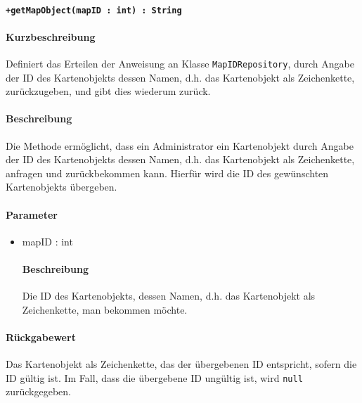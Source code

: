 \paragraph*{\texttt{+getMapObject(mapID : int) : String}}%
\paragraph*{Kurzbeschreibung}
Definiert das Erteilen der Anweisung an Klasse \texttt{MapIDRepository}, durch Angabe der ID des Kartenobjekts dessen Namen, d.h. das Kartenobjekt als Zeichenkette, zurückzugeben, und gibt dies wiederum zurück.
\paragraph*{Beschreibung}
Die Methode ermöglicht, dass ein Administrator ein Kartenobjekt durch Angabe der ID des Kartenobjekts dessen Namen, d.h. das Kartenobjekt als Zeichenkette, anfragen und zurückbekommen kann.
Hierfür wird die ID des gewünschten Kartenobjekts übergeben.
\paragraph*{Parameter}
\begin{itemize}
    \item mapID : int
    		\paragraph*{Beschreibung}
    		Die ID des Kartenobjekts, dessen Namen, d.h. das Kartenobjekt als Zeichenkette, man bekommen möchte.
\end{itemize}
\paragraph*{Rückgabewert}
Das Kartenobjekt als Zeichenkette, das der übergebenen ID entspricht, sofern die ID gültig ist.
Im Fall, dass die übergebene ID ungültig ist, wird \texttt{null} zurückgegeben.
